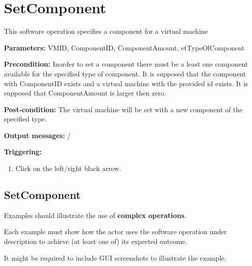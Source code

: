 \section{SetComponent}
\label{operation:SetComponent}
This software operation specifies a component for a virtual machine
\begin{description}

\item \textbf{Parameters:} VMID, ComponentID, ComponentAmount,
etTypeOfComponent
\item \textbf{Precondition:} Inorder to set a component there must be a least
one component available for the specified type of component. It is supposed that
the component with ComponentID exists and a virtual machine with the provided id
exists. It is supposed that ComponentAmount is larger then zero.
\item \textbf{Post-condition:} The virtual machine will be set with a new
component of the specified type.
\item \textbf{Output messages:} /

\item \textbf{Triggering:}
\begin{enumerate}
\item Click on the left/right black arrow.
\end{enumerate}

 
\end{description}
 
\subsection{SetComponent}
Examples should illustrate the use of \textbf{complex operations}.

Each example must show how the actor uses the software operation under
description to achieve (at least one of) its expected outcome.

It might be required to include GUI screenshots to illustrate the example.












